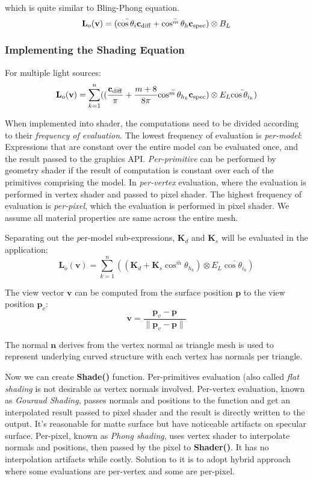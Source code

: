 \documentclass[10pt, a4paper]{article}
\begin{document}
        which is quite similar to Bling-Phong equation.
        $$\textbf{L}_o(\textbf{v}) = (\bar{\cos{\theta_i}}\textbf{c}_{\rm{diff}} + \bar{\cos^m{\theta_h}}\textbf{c}_{\rm{spec}}) \otimes B_L$$
        
        \subsubsection{Implementing the Shading Equation} 
            For multiple light sources: 
            $$\textbf{L}_o(\textbf{v}) = \sum_{k = 1}^n((\frac{\textbf{c}_{\rm{diff}}}{\pi} + \frac{m + 8}{8\pi}\bar{\cos^m{\theta_{h_k}}}\textbf{c}_{\rm{spec}}) \otimes E_L\bar{\cos{\theta_{i_k}}})$$
            
            When implemented into shader, the computations need to be divided according to their \emph{frequency of evaluation}. The lowest frequency of evaluation is \emph{per-model}: Expressions that are constant over the entire model can be evaluated once, and the result passed to the graphics API. \emph{Per-primitive} can be performed by geometry shader if the result of computation is constant over each of the primitives comprising the model. In \emph{per-vertex} evaluation, where the evaluation is performed in vertex shader and passed to pixel shader. The highest frequency of evaluation is \emph{per-pixel}, which the evaluation is performed in pixel shader. We assume all material properties are same across the entire mesh. 

            Separating out the \emph per-model sub-expressions, $\textbf{K}_d$ and $\textbf{K}_s$ will be evaluated in the application: 
            $$\textbf{L}_o(\textbf{v}) = \sum_{k = 1}^n((\textbf{K}_d + \textbf{K}_s\bar{\cos^m{\theta_{h_k}}}) \otimes E_L\bar{\cos{\theta_{i_k}}})$$
            
            The view vector $\textbf{v}$ can be computed from the surface position $\textbf{p}$ to the view position $\textbf{p}_v$: 
            $$ \textbf{v} = \frac{\textbf{p}_v - \textbf{p}}{\parallel \textbf{p}_v - \textbf{p} \parallel}$$ 
            
            The normal $\textbf{n}$ derives from the vertex normal as triangle mesh is used to represent underlying curved structure with each vertex has normals per triangle. 
            
            Now we can create \textbf{Shade()} function. Per-primitives evaluation (also called \emph{flat shading} is not desirable as vertex normals involved. Per-vertex evaluation, known as \emph{Gouraud Shading}, passes normals and positions to the function and get an interpolated result passed to pixel shader and the result is directly written to the output. It's reasonable for matte surface but have noticeable artifacts on specular surface. Per-pixel, known as \emph{Phong shading}, uses vertex shader to interpolate normals and positions, then passed by the pixel to \textbf{Shader()}. It has no interpolation artifacts while costly. Solution to it is to adopt hybrid approach where some evaluations are per-vertex and some are per-pixel.
\end{document}
